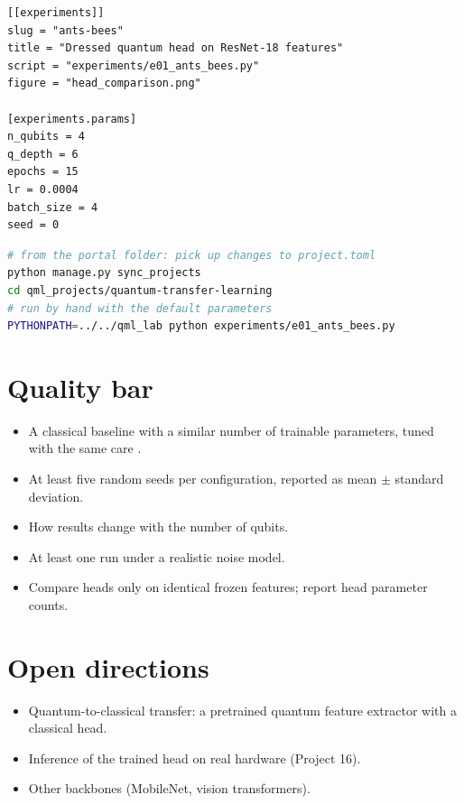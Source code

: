 \documentclass[11pt,a4paper]{article}
\begin{document}
\begin{lstlisting}[language={}]
[[experiments]]
slug = "ants-bees"
title = "Dressed quantum head on ResNet-18 features"
script = "experiments/e01_ants_bees.py"
figure = "head_comparison.png"

[experiments.params]
n_qubits = 4
q_depth = 6
epochs = 15
lr = 0.0004
batch_size = 4
seed = 0
\end{lstlisting}

\begin{lstlisting}[language=bash]
# from the portal folder: pick up changes to project.toml
python manage.py sync_projects
cd qml_projects/quantum-transfer-learning
# run by hand with the default parameters
PYTHONPATH=../../qml_lab python experiments/e01_ants_bees.py
\end{lstlisting}

\section{Quality bar}
\begin{itemize}
  \item A classical baseline with a similar number of trainable parameters, tuned with the same care \citep{bowles2024}.
  \item At least five random seeds per configuration, reported as mean $\pm$ standard deviation.
  \item How results change with the number of qubits.
  \item At least one run under a realistic noise model.
  \item Compare heads only on identical frozen features; report head parameter counts.
\end{itemize}

\section{Open directions}
\begin{itemize}
  \item Quantum-to-classical transfer: a pretrained quantum feature extractor with a classical head.
  \item Inference of the trained head on real hardware (Project 16).
  \item Other backbones (MobileNet, vision transformers).
\end{itemize}
\end{document}
